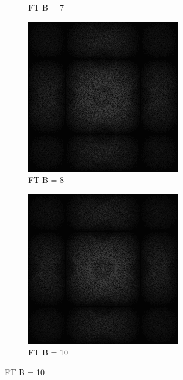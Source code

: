 \begin{figure}[H]
\begin{subfigure}[b]{0.2\linewidth}
      \caption{FT B = 7}
      \label{pic:fftB_7}
    \end{subfigure}
    \begin{subfigure}[b]{0.2\linewidth}
      \includegraphics[width=\linewidth]{content/TemporalerAlg/Bilder/Sorting/DiffDimensions/8/seed_debug_5.0_small.png}
      \caption{FT B = 8}
      \label{pic:fftB_8}
    \end{subfigure}
    \begin{subfigure}[b]{0.2\linewidth}
        \includegraphics[width=\linewidth]{content/TemporalerAlg/Bilder/Sorting/DiffDimensions/10/seed_debug_5.0_small.png}
        \caption{FT B = 10}
        \label{pic:fftB_10}
    \end{subfigure}
    

\end{figure}
